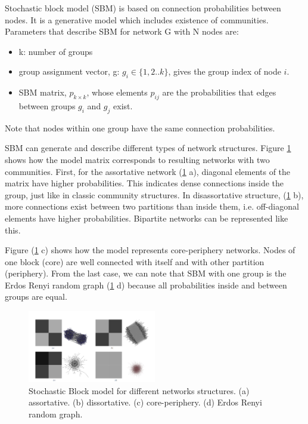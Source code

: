 Stochastic block model (SBM) is based on connection probabilities between nodes. It is a generative model which includes existence of communities. Parameters that describe SBM for network G with N nodes are:

\begin{itemize}
	\item k: number of groups
	\item group assignment vector, g: $g_i \in\{1,2..k\}$, gives the group index of node $i$.
	\item SBM matrix, $p_{k \times k}$, whose elements $p_{ij}$ are the probabilities that edges between groups $g_i$ and $g_j$ exist.
\end{itemize}

Note that nodes within one group have the same connection probabilities.

SBM can generate and describe different types of network structures. Figure \ref{fig:SBM} \cite{userguide} shows how the model matrix corresponds to resulting networks with two communities. First, for the assortative network (\ref{fig:SBM} a), diagonal elements of the matrix have higher probabilities. This indicates dense connections inside the group, just like in classic community structures. In disassortative structure, (\ref{fig:SBM} b), more connections exist between two partitions than inside them, i.e. off-diagonal elements have higher probabilities. Bipartite networks can be represented like this. 

Figure (\ref{fig:SBM} c) shows how the model represents core-periphery networks. Nodes of one block (core) are well connected with itself and with other partition (periphery). From the last case, we can note that SBM with one group is the Erdos Renyi random graph (\ref{fig:SBM} d) because all probabilities inside and between groups are equal.

\begin{figure}[!h]
	\centering
	\includegraphics[width=0.5\textwidth]{Figures/structures.png}
	\caption{Stochastic Block model for different networks structures. (a) assortative. (b) dissortative. (c) core-periphery. (d) Erdos Renyi random graph.}
	\label{fig:SBM}
\end{figure}



